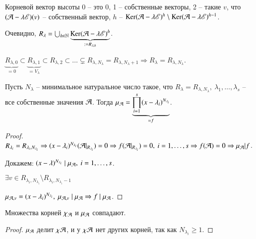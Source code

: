 \documentclass[main]{subfiles}
\begin{document}
Корневой вектор высоты 0 -- это 0, 1 -- собственные векторы, 2 -- такие $v$, что $(\mathcal{A} - \lambda \mathscr{E})(v)$ -- собственный вектор,
$h$ -- $\operatorname{Ker}(\mathcal{A} - \lambda \mathscr{E})^h \setminus \operatorname{Ker}(\mathcal{A} - \lambda \mathscr{E})^{h-1}$.

Очевидно, $R_{\lambda} = \bigcup_{h \in \mathbb{N}} \underbrace{\operatorname{Ker}(\mathcal{A} - \lambda \mathscr{E})^h}_{:= R_{\lambda, h}}$.

$\underbrace{R_{\lambda, 0}}_{=0} \subset \underbrace{R_{\lambda, 1}}_{= V_{\lambda}} \subset R_{\lambda, 2} \subset \ldots \subsetneq  R_{\lambda, N_{\lambda}} = R_{\lambda, N_{\lambda} + 1} \Rightarrow
  R_{\lambda} = R_{\lambda, N_{\lambda}}$.

\begin{proposition}
  Пусть $N_{\lambda}$ -- минимальное натуральное число такое, что $R_{\lambda} = R_{\lambda, N_{\lambda}}, \ \lambda_1, \ldots, \lambda_s$ -- все собственные значения $\mathcal{A}$.
  Тогда ${\mu}_{\mathcal{A}} = \underbrace{\prod_{i = 1}^s(x-\lambda_i)^{N_{\lambda_i}}}_{=f}$.
\end{proposition}

\begin{proof}
  $R_{\lambda_i} = R_{\lambda_i, N_{\lambda_i}} \Rightarrow (x - \lambda_i)^{N_{\lambda_i}}(\mathcal{A}|_{R_{\lambda_i}}) = 0 \Rightarrow
    f(\mathcal{A}|_{R_{\lambda_i}}) = 0, \ i = 1, \ldots, s \Rightarrow f(\mathcal{A}) = 0 \Rightarrow \mu_{\mathcal{A}} | f$.

  Докажем: $(x - \lambda)^{N_{\lambda_i}} \mid \mu_{\mathcal{A}}, \ i = 1, \ldots, s$.

  $\exists v \in R_{\lambda_i, N_{\lambda_i}}\setminus R_{\lambda_i, N_{\lambda_i} - 1}$

  $\mu_{\mathcal{A}, v} = (x - \lambda_i)^{N_{\lambda_i}}, \ \mu_{\mathcal{A}, v} \mid \mu_{\mathcal{A}} \Rightarrow f \mid \mu_{\mathcal{A}}$.
\end{proof}

\begin{corollary}
  Множества корней $\chi_{\mathcal{A}}$ и $\mu_{\mathcal{A}}$ совпадают.
\end{corollary}

\begin{proof}
  $\mu_{\mathcal{A}}$ делит $\chi{\mathcal{A}}$, и у $\chi{\mathcal{A}}$ нет других корней, так как $N_{\lambda_i} \geq  1$.
\end{proof}
\end{document}
